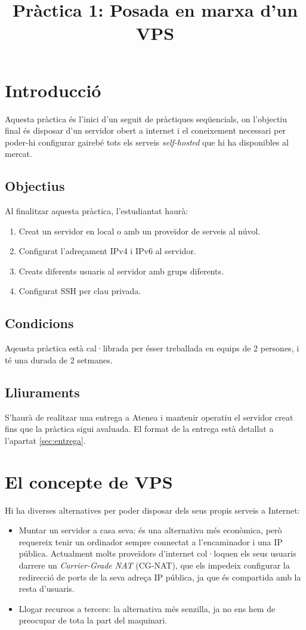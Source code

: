 \documentclass{practicaitic}
\title{Pràctica 1: Posada en marxa d'un VPS}
\begin{document}
\section{Introducció}

Aquesta pràctica és l'inici d'un seguit de pràctiques seqüencials, on
l'objectiu final és disposar d'un servidor obert a internet i el coneixement
necessari per poder-hi configurar gairebé tots els serveis \textit{self-hosted}
que hi ha disponibles al mercat.

\subsection{Objectius}

Al finalitzar aquesta pràctica, l'estudiantat haurà:
\begin{enumerate}
  \item Creat un servidor en local o amb un proveïdor de serveis al núvol.
  \item Configurat l'adreçament IPv4 i IPv6 al servidor.
  \item Creats diferents usuaris al servidor amb grups diferents.
  \item Configurat SSH per clau privada.
\end{enumerate}

\subsection{Condicions}

Aqeusta pràctica està cal·librada per ésser treballada en equips de 2 persones,
i té una durada de 2 setmanes.

\subsection{Lliuraments}

S'haurà de realitzar una entrega a Atenea i mantenir operatiu el servidor creat
fins que la pràctica sigui avaluada. El format de la entrega està detallat a
l'apartat \ref{sec:entrega}.

\section{El concepte de VPS}

Hi ha diverses alternatives per poder disposar dels seus propis serveis a
Internet:

\begin{itemize}
  \item Muntar un servidor a casa seva: és una alternativa més econòmica, però
  requereix tenir un ordinador sempre connectat a l'encaminador i una IP pública.
  Actualment molts proveïdors d'internet col·loquen els seus usuaris darrere un
  \textit{Carrier-Grade NAT} (CG-NAT), que els impedeix configurar la
  redirecció de ports de la seva adreça IP pública, ja que és compartida amb la
  resta d'usuaris.
  \item Llogar recursos a tercers: la alternativa més senzilla, ja no ens hem
  de preocupar de tota la part del maquinari.
\end{itemize}
\end{document}

